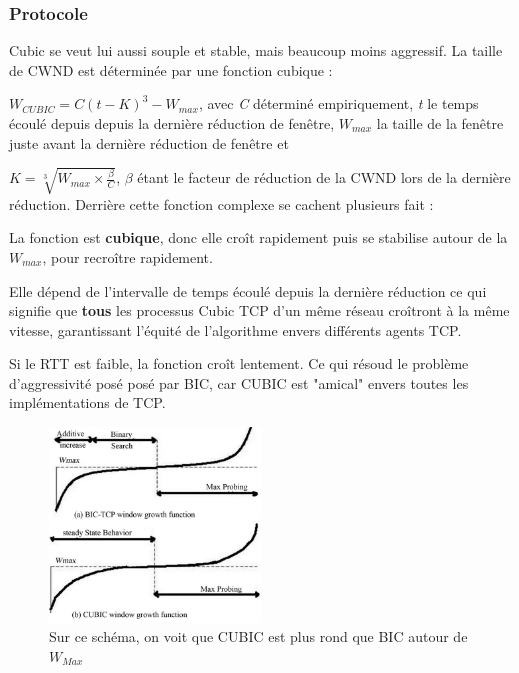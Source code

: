 \documentclass[	DIV=calc,%
							paper=a4,%
							fontsize=11pt,%
							twocolumn]{scrartcl}	 					%
\begin{document}
\subsubsection*{Protocole}
Cubic se veut lui aussi souple et stable, mais beaucoup moins aggressif. La taille de CWND est déterminée par une fonction cubique : 

$W_{CUBIC} = C(t-K)^3 - W_{max}$, avec \textit{C} déterminé empiriquement, \textit{t} le temps écoulé depuis depuis la dernière réduction de fenêtre, $W_{max}$ la taille de la fenêtre juste avant la dernière réduction de fenêtre et 

$K = \sqrt[3]{W_{max}\times\frac{\beta}{C}}$, $\beta$ étant le facteur de réduction de la CWND lors de la dernière réduction.
Derrière cette fonction complexe se cachent plusieurs fait :
\begin{description}
\item{La fonction est \textbf{cubique}, donc elle croît rapidement puis se stabilise autour de la $W_{max}$, pour recroître rapidement.}
\item{Elle dépend de l'intervalle de temps écoulé depuis la dernière réduction ce qui signifie que \textbf{tous} les processus Cubic TCP d'un même réseau croîtront à la même vitesse, garantissant l'équité de l'algorithme envers différents agents TCP.}
\item{Si le RTT est faible, la fonction croît lentement. Ce qui résoud le problème d'aggressivité posé posé par BIC, car CUBIC est "amical" envers toutes les implémentations de TCP.} 	
\end{description}

\begin{figure}[h]
    \centering
    \includegraphics[width=0.5\textwidth]{Compound_vs_BIC}
    \caption{Sur ce schéma, on voit que CUBIC est plus rond que BIC autour de $W_{Max}$}
    \label{fig:mesh1}
\end{figure}
\end{document}
